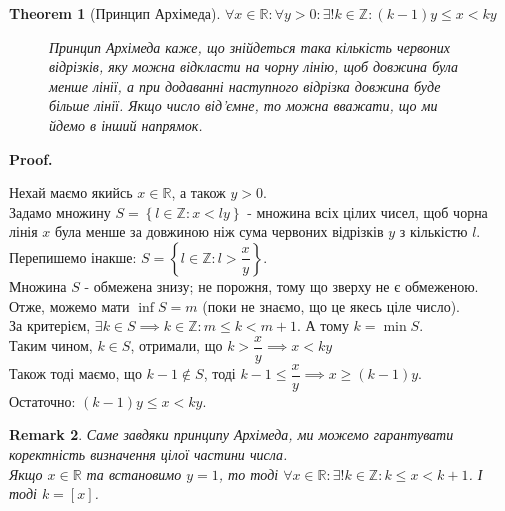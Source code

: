 \documentclass[a4paper, 14pt]{article}
\makeatletter
\def\qed{$\blacksquare$}
\theoremstyle{theoremdd}
\newtheorem{theorem}{Theorem}[subsection]
\theoremstyle{theoremdd}
\theoremstyle{theoremdd}
\theoremstyle{theoremdd}
\theoremstyle{theoremdd}
\theoremstyle{theoremdd}
\newtheorem{remark}[theorem]{Remark}
\theoremstyle{theoremdd}
\theoremstyle{theoremdd}
\renewenvironment{proof}[1][Proof.\\]{\par
\pushQED{\hfill \qed}%
\normalfont \topsep6\p@\@plus6\p@\relax
\trivlist
\item\relax
{\bfseries
#1\@addpunct{.}}\hspace\labelsep\ignorespaces
}{%
\popQED\endtrivlist\@endpefalse
}
\makeatother
\begin{document}
	\begin{theorem}[Принцип Архімеда]
	$\forall x \in \mathbb{R}: \forall y > 0: \exists ! k \in \mathbb{Z}: (k-1)y \leq x < ky$
	\begin{figure}[H]
	\qquad
	\caption*{Принцип Архімеда каже, що знійдеться така кількість червоних відрізків, яку можна відкласти на чорну лінію, щоб довжина була менше лінії, а при додаванні наступного відрізка довжина буде більше лінії. Якщо число від'ємне, то можна вважати, що ми йдемо в інший напрямок.}
	\end{figure}
	\end{theorem}
	
	\begin{proof}
	Нехай маємо якийсь $x \in \mathbb{R}$, а також $y > 0$.\\
	Задамо множину $S = \left\{l \in \mathbb{Z} :  x < ly \right\}$ - множина всіх цілих чисел, щоб чорна лінія $x$ була менше за довжиною ніж сума червоних відрізків $y$ з кількістю $l$.\\
	Перепишемо інакше: $S = \left\{l \in \mathbb{Z} :  l > \dfrac{x}{y} \right\}$.\\
	Множина $S$ - обмежена знизу; не порожня, тому що зверху не є обмеженою. Отже, можемо мати $\inf S = m$ (поки не знаємо, що це якесь ціле число). \\
	За критерієм, $\exists k \in S \implies k \in \mathbb{Z}: m \leq k < m+1$. А тому $k = \min S$.\\
	Таким чином, $k \in S$, отримали, що $k > \dfrac{x}{y} \implies x < ky$\\
	Також тоді маємо, що $k-1 \not \in S$, тоді $k-1 \leq \dfrac{x}{y} \implies x \geq (k-1)y$.\\
	Остаточно: $(k-1)y \leq x < ky$.
	\end{proof}
	
	\begin{remark}
	Саме завдяки принципу Архімеда, ми можемо гарантувати коректність визначення цілої частини числа.\\
	Якщо $x \in \mathbb{R}$ та встановимо $y = 1$, то тоді $\forall x \in \mathbb{R}: \exists !k \in \mathbb{Z}: k \leq x < k+1$. І тоді $k = [x]$.
	\end{remark}
	
\end{document}
